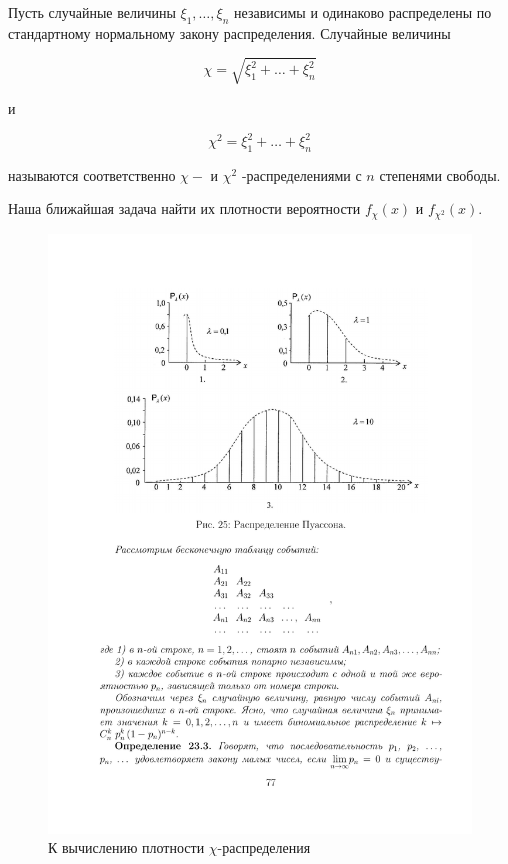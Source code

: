 \begin{definition}
Пусть случайные величины $\xi_1 , \ldots , \xi_n$ независимы и одинаково распределены по стандартному нормальному закону распределения. Случайные величины

$$\chi = \sqrt{\xi_1^2 +\ldots + \xi_n^2 }$$

и

$$\chi^2 = \xi_1^2 + \ldots + \xi_n^2$$

называются соответственно $\chi-$ и $\chi^2$ -распределениями с $n$ степенями свободы.

Наша ближайшая задача найти их плотности вероятности $f_{\chi} (x)$ и $f_{\chi^2} (x)$.
\end{definition}

\begin{figure}[H]
	\centering
	\includegraphics[]{pic/pic25}
	\caption{К вычислению плотности $\chi$-распределения}
	\label{fig25}
\end{figure}

